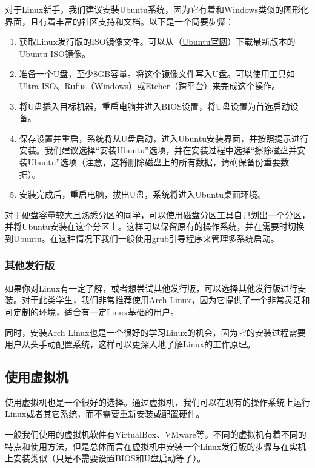 \documentclass[../main.tex]{subfiles}
\begin{document}
对于Linux新手，我们建议安装Ubuntu系统，因为它有着和Windows类似的图形化界面，且有着丰富的社区支持和文档。以下是一个简要步骤：

\begin{enumerate}
    \item 获取Linux发行版的ISO镜像文件。可以从（\href{https://ubuntu.com/download}{Ubuntu官网}）下载最新版本的Ubuntu ISO镜像。
    \item 准备一个U盘，至少8GB容量。将这个镜像文件写入U盘。可以使用工具如Ultra ISO、Rufus（Windows）或Etcher（跨平台）来完成这个操作。
    \item 将U盘插入目标机器，重启电脑并进入BIOS设置，将U盘设置为首选启动设备。
    \item 保存设置并重启，系统将从U盘启动，进入Ubuntu安装界面，并按照提示进行安装。我们建议选择“安装Ubuntu”选项，并在安装过程中选择“擦除磁盘并安装Ubuntu”选项（注意，这将删除磁盘上的所有数据，请确保备份重要数据）。
    \item 安装完成后，重启电脑，拔出U盘，系统将进入Ubuntu桌面环境。
\end{enumerate}

对于硬盘容量较大且熟悉分区的同学，可以使用磁盘分区工具自己划出一个分区，并将Ubuntu安装在这个分区上。这样可以保留原有的操作系统，并在需要时切换到Ubuntu。在这种情况下我们一般使用grub引导程序来管理多系统启动。

\subsubsection{其他发行版}

如果你对Linux有一定了解，或者想尝试其他发行版，可以选择其他发行版进行安装。对于此类学生，我们非常推荐使用Arch Linux，因为它提供了一个非常灵活和可定制的环境，适合有一定Linux基础的用户。

同时，安装Arch Linux也是一个很好的学习Linux的机会，因为它的安装过程需要用户从头手动配置系统，这样可以更深入地了解Linux的工作原理。

\subsection{使用虚拟机}

使用虚拟机也是一个很好的选择。通过虚拟机，我们可以在现有的操作系统上运行Linux或者其它系统，而不需要重新安装或配置硬件。

一般我们使用的虚拟机软件有VirtualBox、VMware等。不同的虚拟机有着不同的特点和使用方法，但是总体而言在虚拟机中安装一个Linux发行版的步骤与在实机上安装类似（只是不需要设置BIOS和U盘启动等了）。
\end{document}
